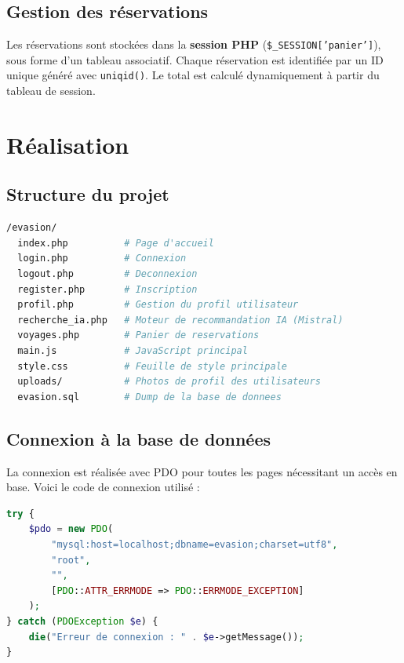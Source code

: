 \documentclass[a4paper,12pt]{article}
\begin{document}
\subsection{Gestion des réservations}

Les réservations sont stockées dans la \textbf{session PHP} (\texttt{\$\_SESSION['panier']}), sous forme d'un tableau associatif. Chaque réservation est identifiée par un ID unique généré avec \texttt{uniqid()}. Le total est calculé dynamiquement à partir du tableau de session.

\section{Réalisation}

\subsection{Structure du projet}

\begin{lstlisting}[language=bash, caption={Arborescence des fichiers}]
/evasion/
  index.php          # Page d'accueil
  login.php          # Connexion
  logout.php         # Deconnexion
  register.php       # Inscription
  profil.php         # Gestion du profil utilisateur
  recherche_ia.php   # Moteur de recommandation IA (Mistral)
  voyages.php        # Panier de reservations
  main.js            # JavaScript principal
  style.css          # Feuille de style principale
  uploads/           # Photos de profil des utilisateurs
  evasion.sql        # Dump de la base de donnees
\end{lstlisting}

\subsection{Connexion à la base de données}

La connexion est réalisée avec PDO pour toutes les pages nécessitant un accès en base. Voici le code de connexion utilisé :

\begin{lstlisting}[language=PHP, caption={Connexion PDO}]
try {
    $pdo = new PDO(
        "mysql:host=localhost;dbname=evasion;charset=utf8",
        "root",
        "",
        [PDO::ATTR_ERRMODE => PDO::ERRMODE_EXCEPTION]
    );
} catch (PDOException $e) {
    die("Erreur de connexion : " . $e->getMessage());
}
\end{lstlisting}
\end{document}
